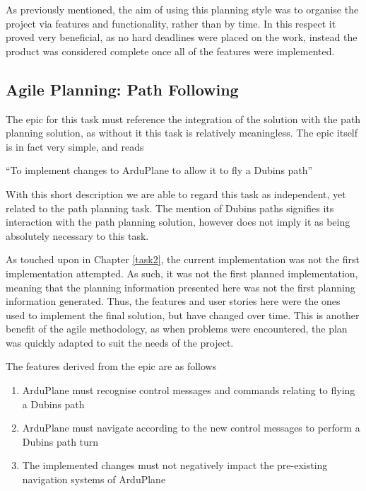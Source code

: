As previously mentioned, the aim of using this planning style was to organise the project via features and functionality, rather than by time. In this respect it proved very beneficial, as no hard deadlines were placed on the work, instead the product was considered complete once all of the features were implemented. 

\subsection{Agile Planning: Path Following}
\label{planning:agile:following}

The epic for this task must reference the integration of the solution with the path planning solution, as without it this task is relatively meaningless. The epic itself is in fact very simple, and reads

\begin{displayquote}
	``To implement changes to ArduPlane to allow it to fly a Dubins path''
\end{displayquote}

With this short description we are able to regard this task as independent, yet related to the path planning task. The mention of Dubins paths signifies its interaction with the path planning solution, however does not imply it as being absolutely necessary to this task.

As touched upon in Chapter \ref{task2}, the current implementation was not the first implementation attempted. As such, it was not the first planned implementation, meaning that the planning information presented here was not the first planning information generated. Thus, the features and user stories here were the ones used to implement the final solution, but have changed over time. This is another benefit of the agile methodology, as when problems were encountered, the plan was quickly adapted to suit the needs of the project. 

The features derived from the epic are as follows
\begin{enumerate}
	\item ArduPlane must recognise control messages and commands relating to flying a Dubins path
	\item ArduPlane must navigate according to the new control messages to perform a Dubins path turn
	\item The implemented changes must not negatively impact the pre-existing navigation systems of ArduPlane
\end{enumerate}

